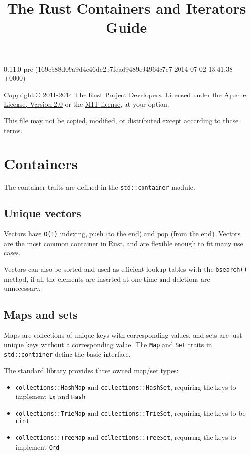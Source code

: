 \documentclass[]{article}
\title{The Rust Containers and Iterators Guide}
\begin{document}
\maketitle

0.11.0-pre (169c988d09a9d4e46de2b7fead9489e94964c7c7 2014-07-02 18:41:38 +0000)

Copyright © 2011-2014 The Rust Project Developers. Licensed under the
\href{http://www.apache.org/licenses/LICENSE-2.0}{Apache License,
Version 2.0} or the \href{http://opensource.org/licenses/MIT}{MIT
license}, at your option.

This file may not be copied, modified, or distributed except according
to those terms.

{
\hypersetup{linkcolor=black}
\setcounter{tocdepth}{3}
\tableofcontents
}
\section{Containers}\label{containers}

The container traits are defined in the \texttt{std::container} module.

\subsection{Unique vectors}\label{unique-vectors}

Vectors have \texttt{O(1)} indexing, push (to the end) and pop (from the
end). Vectors are the most common container in Rust, and are flexible
enough to fit many use cases.

Vectors can also be sorted and used as efficient lookup tables with the
\texttt{bsearch()} method, if all the elements are inserted at one time
and deletions are unnecessary.

\subsection{Maps and sets}\label{maps-and-sets}

Maps are collections of unique keys with corresponding values, and sets
are just unique keys without a corresponding value. The \texttt{Map} and
\texttt{Set} traits in \texttt{std::container} define the basic
interface.

The standard library provides three owned map/set types:

\begin{itemize}
\itemsep1pt\parskip0pt
\item
  \texttt{collections::HashMap} and \texttt{collections::HashSet},
  requiring the keys to implement \texttt{Eq} and \texttt{Hash}
\item
  \texttt{collections::TrieMap} and \texttt{collections::TrieSet},
  requiring the keys to be \texttt{uint}
\item
  \texttt{collections::TreeMap} and \texttt{collections::TreeSet},
  requiring the keys to implement \texttt{Ord}
\end{itemize}
\end{document}
